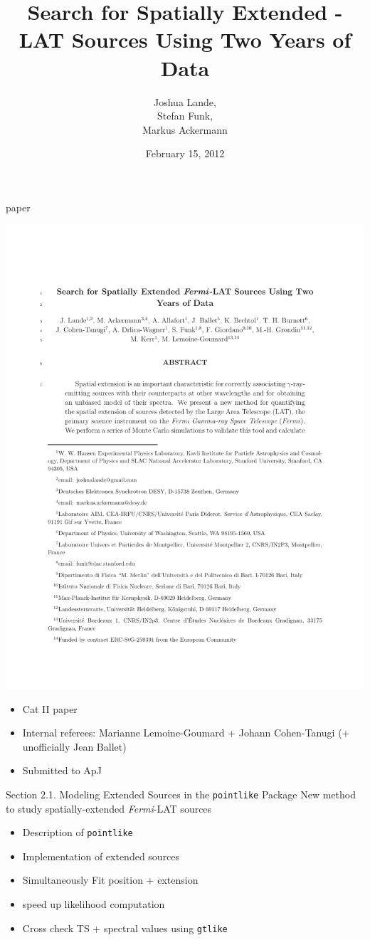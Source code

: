\documentclass[12pt]{beamer}
\title{Search for Spatially Extended \fermi-LAT Sources Using Two Years of Data}
\author{Joshua Lande,\\
Stefan Funk,\\
Markus Ackermann}
\date{February 15, 2012}
\begin{document}
\fermititle

\begin{frame}{paper}

  \includegraphics[scale=0.65]{plots/title.pdf}

  \begin{itemize}
    \item Cat II paper
    \item Internal referees: Marianne Lemoine-Goumard + Johann Cohen-Tanugi (+ unofficially Jean Ballet)
    \item Submitted to ApJ
  \end{itemize}
\end{frame}

\begin{frame}{Section 2.1. Modeling Extended Sources in the \texttt{pointlike} Package}
  New method to study spatially-extended {\em Fermi}-LAT sources
  \begin{itemize}
    \item Description of \texttt{pointlike}
    \item Implementation of extended sources
    \item Simultaneously Fit position + extension
    \item speed up likelihood computation
    \item Cross check TS + spectral values using \texttt{gtlike}
  \end{itemize}
\end{frame}
\end{document}
